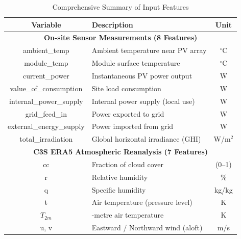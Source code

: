 \documentclass[conference]{IEEEtran}
\begin{document}
	\begin{table}[htbp]
		\centering
		\caption{Comprehensive Summary of Input Features}
		\label{tab:comprehensive_features}
		\setlength{\tabcolsep}{3pt}
		\renewcommand{\arraystretch}{1.2} %
		\begin{tabularx}{\columnwidth}{|c|>{\centering\arraybackslash}X|c|}
			\hline
			\textbf{Variable} & \textbf{Description} & \textbf{Unit} \\ \hline
			
			\multicolumn{3}{|c|}{\textbf{On-site Sensor Measurements (8 Features)}} \\ \hline
			ambient\_temp            & Ambient temperature near PV array                & $^\circ$C \\ \hline
			module\_temp             & Module surface temperature                       & $^\circ$C \\ \hline
			current\_power           & Instantaneous PV power output                    & W \\ \hline
			value\_of\_consumption   & Site load consumption                            & W \\ \hline
			internal\_power\_supply  & Internal power supply (local use)                & W \\ \hline
			grid\_feed\_in           & Power exported to grid                           & W \\ \hline
			external\_energy\_supply & Power imported from grid                         & W \\ \hline
			total\_irradiation       & Global horizontal irradiance (GHI)               & W/m$^2$ \\ \hline
			
			\multicolumn{3}{|c|}{\textbf{C3S ERA5 Atmospheric Reanalysis (7 Features)}} \\ \hline
			cc        & Fraction of cloud cover                              & (0--1) \\ \hline
			r         & Relative humidity                                    & \% \\ \hline
			q         & Specific humidity                                    & kg/kg \\ \hline
			t         & Air temperature (pressure level)                     & K \\ \hline
			$T_{2m}$  & 2-metre air temperature                              & K \\ \hline
			u, v      & Eastward / Northward wind (aloft)                    & m/s \\ \hline
			

\end{tabularx}
\end{table}
\end{document}
